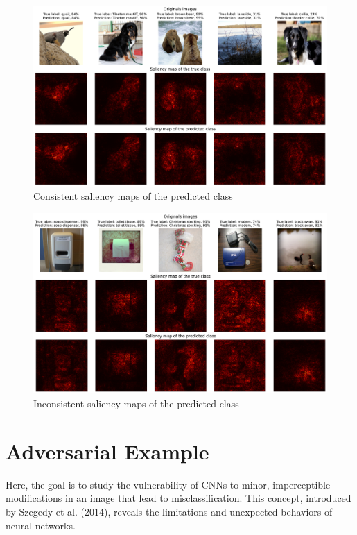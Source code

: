 \begin{figure}[H]
    \centering
    \includegraphics[width=.95\textwidth]{figs/2b/good_saliency_map_vgg16.pdf}
    \caption{Consistent saliency maps of the predicted class}
    \label{fig:good_saliency_map_vgg16}
\end{figure}

\begin{figure}[H]
    \centering  
    \includegraphics[width=.95\textwidth]{figs/2b/bad_saliency_map_vgg16.pdf}
    \caption{Inconsistent saliency maps of the predicted class}
    \label{fig:bad_saliency_map_vgg16}
\end{figure}


\section{Adversarial Example}

Here, the goal is to study the vulnerability of CNNs to minor, imperceptible modifications in an image that lead to misclassification. This concept, introduced by Szegedy et al. (2014), reveals the limitations and unexpected behaviors of neural networks.

